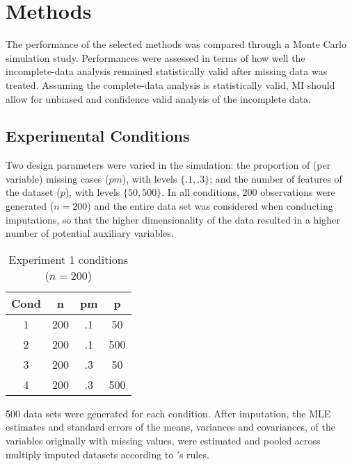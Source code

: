 \maketitle
\section{Methods}

The performance of the selected methods was compared through a Monte Carlo simulation study. Performances
were assessed in terms of how well the incomplete-data analysis remained statistically valid after missing 
data was treated. Assuming the complete-data analysis is statistically valid, MI should allow for unbiased
and confidence valid analysis of the incomplete data.

\subsection{Experimental Conditions}

Two design parameters were varied in the simulation: the proportion of (per variable) missing cases ($pm$), with levels $\{.1, .3\}$; 
and the number of features of the dataset ($p$), with levels $\{50, 500\}$. 
In all conditions, 200 observations were generated ($n = 200$) and the entire data set was considered when 
conducting imputations, so that the higher dimensionality of the data resulted in a higher number of potential 
auxiliary variables.

\begin{table}[h]
	\centering
	\caption{Experiment 1 conditions ($n = 200$)}
	\break
	\begin{tabular}{ c c c c }
		Cond 	& n   & pm 	& p 	\\ 
		 \hline
		 1	& 200 & .1 	& 50  	\\  
		 2	& 200 & .1 	& 500 	\\
		 3	& 200 & .3 	& 50  	\\
		 4	& 200 & .3 	& 500 	\\
		 \hline
	\end{tabular}
	\label{table:exp1_conds}
\end{table}

500 data sets were generated for each condition. After imputation, the MLE estimates and standard errors of 
the means, variances and covariances, of the variables originally with missing values, were estimated and 
pooled across multiply imputed datasets according to \citet{rubin:1987}'s rules.

